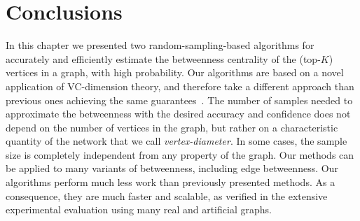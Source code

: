 \section{Conclusions}\label{sec:centrsamplconcl}
In this chapter we presented two random-sampling-based algorithms for accurately and
efficiently estimate the betweenness centrality of the (top-$K$) vertices in a
graph, with high probability. Our algorithms are based on a novel application of
VC-dimension theory, and
therefore take a different approach than previous ones achieving the same
guarantees~\citep{BrandesP07,GeisbergerSS08,JacobKLPT05}. The number of samples
needed to approximate the betweenness with the desired accuracy and confidence
does not depend on the number of vertices in the graph, but rather on a
characteristic quantity of the network that we call
\emph{vertex-diameter}. In some cases, the sample size is completely
independent from any property of the graph. %
Our methods can be applied to many variants of betweenness, including edge
betweenness. Our algorithms perform much less work than previously presented
methods. %
As a consequence, they are much faster and scalable, as verified in the
extensive experimental evaluation using many real and artificial graphs. 


